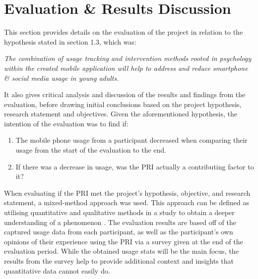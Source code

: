 \documentclass[12pt]{article}
\begin{document}
\newpage


\section{Evaluation \& Results Discussion}
This section provides details on the evaluation of the project in relation to the hypothesis stated in section 1.3, which was: \newline

\noindent\textit{The combination of usage tracking and intervention methods rooted in psychology within the created mobile 
application will help to address and reduce smartphone \& social media usage in young adults.} \newline

It also gives critical analysis and discussion of the results and findings from the evaluation, before drawing initial conclusions based on the
project hypothesis, research statement and objectives. Given the aforementioned hypothesis, the intention of the evaluation was to find if:

\begin{enumerate}
	\item The mobile phone usage from a participant decreased when comparing their usage from the start of the evaluation to the end.
	\item If there was a decrease in usage, was the PRI actually a contributing factor to it?
\end{enumerate}

\noindent When evaluating if the PRI met the project's hypothesis, objective, and research statement, a mixed-method approach was used. This approach can be defined as utilising quantitative and
qualitative methods in a study to obtain a deeper understanding of a phenomenon \autocite{RefWorks:RefID:171-johnson2007definition}. The evaluation results are based off of the captured usage 
data from each participant, as well as the participant's own opinions of their experience using the PRI via a survey given at the end of the evaluation period. While the obtained usage stats 
will be the main focus, the results from the survey help to provide additional context and insights that quantitative data cannot easily do.
\end{document}
